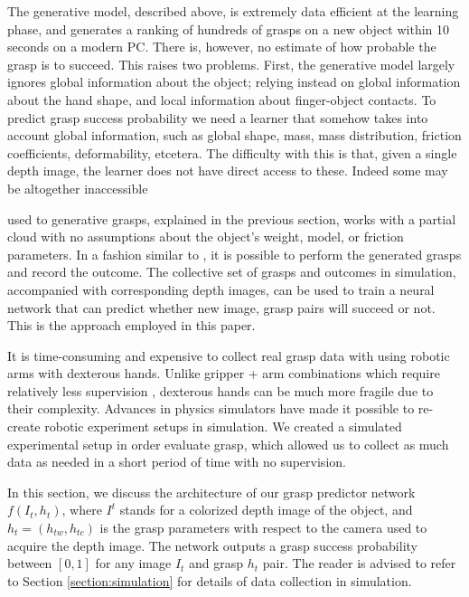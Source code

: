 
The generative model, described above, is extremely data efficient at the learning phase, and generates a ranking of hundreds of grasps on a new object within 10 seconds on a modern PC. There is, however, no estimate of how probable the grasp is to succeed. This raises two problems. First, the generative model largely ignores global information about the object; relying instead on global information about the hand shape, and local information about finger-object contacts. To predict grasp success probability we need a learner that somehow takes into account global information, such as global shape, mass, mass distribution, friction coefficients, deformability, etcetera. The difficulty with this is that, given a single depth image, the learner does not have direct access to these. Indeed some may be altogether inaccessible 


used to generative grasps, explained in the previous section, works with a partial cloud with no assumptions about the object's weight, model, or friction parameters. In a fashion similar to \cite{Levine1}, it is possible to perform the generated grasps and record the outcome. The collective set of grasps and outcomes in simulation, accompanied with corresponding depth images, can be used to train a neural network that can predict whether new image, grasp pairs will succeed or not. This is the approach employed in this paper. 

It is time-consuming and expensive to collect real grasp data with using robotic arms with dexterous hands. Unlike gripper + arm combinations which require relatively less supervision \cite{Levine1}, dexterous hands can be much more fragile due to their complexity. Advances in physics simulators have made it possible to re-create robotic experiment setups in simulation. We created a simulated experimental setup in order evaluate grasp, which allowed us to collect as much data as needed in a short period of time with no supervision.

In this section, we discuss the architecture of our grasp predictor network $f(I_t, h_t)$, where $I^t$ stands for a colorized depth image of the object, and $h_t = (h_{tw}, h_{tc})$ is the grasp parameters with respect to the camera used to acquire the depth image. The network outputs a grasp success probability between $[0,1]$ for any image $I_t$ and grasp $h_t$ pair. The reader is advised to refer to Section \ref{section:simulation} for details of data collection in simulation.

